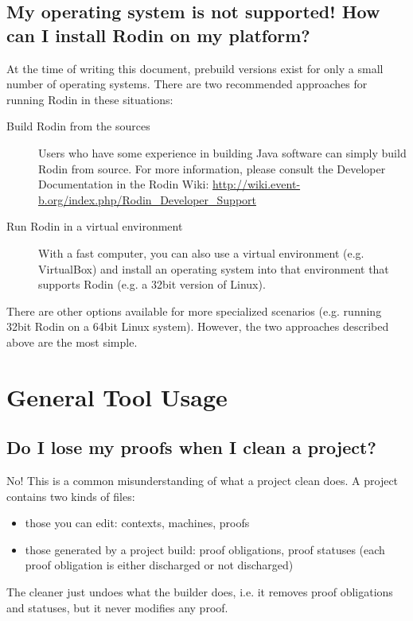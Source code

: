 \subsection{My operating system is not supported!  How can I install Rodin on my platform?}
\label{faq_os_not_supported}
At the time of writing this document, prebuild versions exist for only a small number of operating systems.  There are two recommended approaches for running Rodin in these situations:
\begin{description}
	\item[Build Rodin from the sources] Users who have some experience in building Java software can simply build Rodin from source.  For more information, please consult the Developer Documentation in the Rodin Wiki: \url{http://wiki.event-b.org/index.php/Rodin_Developer_Support}
	\item[Run Rodin in a virtual environment] With a fast computer, you can also use a virtual environment (e.g. VirtualBox) and install an operating system into that environment that supports Rodin (e.g. a 32bit version of Linux).
\end{description}

There are other options available for more specialized scenarios (e.g. running 32bit Rodin on a 64bit Linux system).  However, the two approaches described above are the most simple.

\section{General Tool Usage}

\subsection{Do I lose my proofs when I clean a project?}
No! This is a common misunderstanding of what a project clean does. A project contains two kinds of files: 

\begin{itemize}
	\item those you can edit: contexts, machines, proofs 
	\item those generated by a project build: proof obligations, proof statuses (each proof obligation is either discharged or not discharged) 
\end{itemize}

The cleaner just undoes what the builder does, i.e. it removes proof obligations and statuses, but it never modifies any proof.

